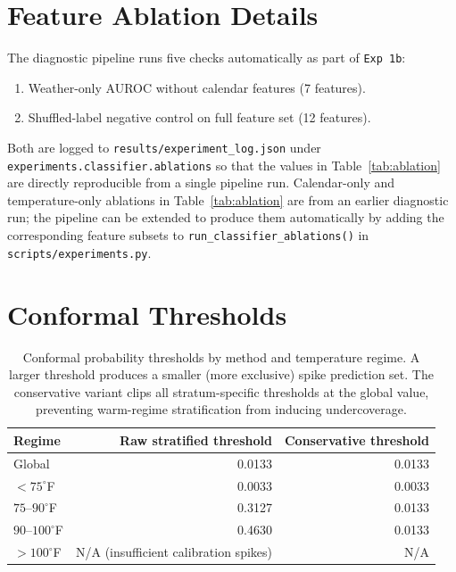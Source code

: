 \documentclass{article}
\begin{document}
\section{Feature Ablation Details}
\label{app:ablation}

The diagnostic pipeline runs five checks automatically as part of
\texttt{Exp 1b}:
\begin{enumerate}
    \item Weather-only AUROC without calendar features (7 features).
    \item Shuffled-label negative control on full feature set (12 features).
\end{enumerate}
Both are logged to \texttt{results/experiment\_log.json} under
\texttt{experiments.classifier.ablations} so that the values in
Table~\ref{tab:ablation} are directly reproducible from a single pipeline run.
Calendar-only and temperature-only ablations in Table~\ref{tab:ablation}
are from an earlier diagnostic run; the pipeline can be extended to produce
them automatically by adding the corresponding feature subsets to
\texttt{run\_classifier\_ablations()} in \texttt{scripts/experiments.py}.

\section{Conformal Thresholds}
\label{app:thresholds}

\begin{table}[h]
\centering
\caption{Conformal probability thresholds by method and temperature regime.
A larger threshold produces a smaller (more exclusive) spike prediction set.
The conservative variant clips all stratum-specific thresholds at the global
value, preventing warm-regime stratification from inducing undercoverage.}
\label{tab:thresholds}
\begin{tabular}{lrr}
\toprule
Regime & Raw stratified threshold & Conservative threshold \\
\midrule
Global & 0.0133 & 0.0133 \\
$<75^{\circ}$F & 0.0033 & 0.0033 \\
$75$--$90^{\circ}$F & 0.3127 & 0.0133 \\
$90$--$100^{\circ}$F & 0.4630 & 0.0133 \\
$>100^{\circ}$F & N/A (insufficient calibration spikes) & N/A \\
\bottomrule
\end{tabular}
\end{table}
\end{document}
